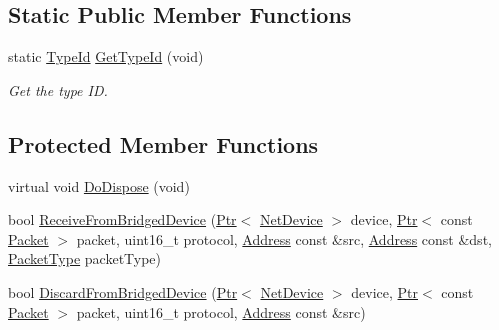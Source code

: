 \subsection*{Static Public Member Functions}
\begin{DoxyCompactItemize}
\item 
static \hyperlink{classns3_1_1TypeId}{Type\+Id} \hyperlink{classns3_1_1TapBridge_a9ac80b6070b0e111d23367c42e411746}{Get\+Type\+Id} (void)
\begin{DoxyCompactList}\small\item\em Get the type ID. \end{DoxyCompactList}\end{DoxyCompactItemize}
\subsection*{Protected Member Functions}
\begin{DoxyCompactItemize}
\item 
virtual void \hyperlink{classns3_1_1TapBridge_afb9e635e18724e9de7371ff492117599}{Do\+Dispose} (void)
\item 
bool \hyperlink{classns3_1_1TapBridge_ac065f518a2c18292b88609f8500a61bb}{Receive\+From\+Bridged\+Device} (\hyperlink{classns3_1_1Ptr}{Ptr}$<$ \hyperlink{classns3_1_1NetDevice}{Net\+Device} $>$ device, \hyperlink{classns3_1_1Ptr}{Ptr}$<$ const \hyperlink{classns3_1_1Packet}{Packet} $>$ packet, uint16\+\_\+t protocol, \hyperlink{classns3_1_1Address}{Address} const \&src, \hyperlink{classns3_1_1Address}{Address} const \&dst, \hyperlink{classns3_1_1NetDevice_ace65153f09144f55a0d3e702fc29d6b2}{Packet\+Type} packet\+Type)
\item 
bool \hyperlink{classns3_1_1TapBridge_a1837b0aa11c479938664a05cc5794c5f}{Discard\+From\+Bridged\+Device} (\hyperlink{classns3_1_1Ptr}{Ptr}$<$ \hyperlink{classns3_1_1NetDevice}{Net\+Device} $>$ device, \hyperlink{classns3_1_1Ptr}{Ptr}$<$ const \hyperlink{classns3_1_1Packet}{Packet} $>$ packet, uint16\+\_\+t protocol, \hyperlink{classns3_1_1Address}{Address} const \&src)
\end{DoxyCompactItemize}
